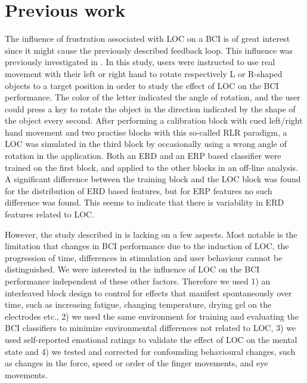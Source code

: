 \section{Previous work}
The influence of frustration associated with \ac{LOC} on a
\ac{BCI} is of great interest since it might cause the previously described
feedback loop. This influence  was previously investigated in
\cite{jatzev2008ecn, zander2009usi}. In this study, users were instructed to
use real movement with their left or right hand to rotate respectively L or
R-shaped objects to a target position in order to study the effect of \acl{LOC}
on the \ac{BCI} performance.
%
The color of the letter indicated the angle of rotation, and the user could
press a key to rotate the object in the direction indicated by the shape of the
object every second.
%
After performing a calibration block with cued left/right hand movement and two
practise blocks with this so-called RLR paradigm, a \ac{LOC} was simulated in
the third block by occasionally using a wrong angle of rotation in the
application. Both an \ac{ERD} and an \ac{ERP} based classifier were trained on
the first block, and applied to the other blocks in an off-line analysis.  A
significant difference between the training block and the \ac{LOC} block was
found for the distribution of \ac{ERD} based features, but for \ac{ERP}
features no such difference was found. This seems to indicate that there is
variability in \ac{ERD} features related to \acl{LOC}. 

However, the study described in \cite{jatzev2008ecn, zander2009usi} is lacking
on a few aspects. Most notable is the limitation that changes in \ac{BCI}
performance due to the induction of \ac{LOC}, the progression of time,
differences in stimulation and user behaviour cannot be distinguished.
%
We were interested in the influence of \ac{LOC} on the \ac{BCI} performance
independent of these other factors. Therefore we used 1) an interleaved block
design to control for effects that manifest spontaneously over time, such as
increasing fatigue, changing temperature, drying gel on the electrodes etc., 2)
we used the same environment for training and evaluating the \ac{BCI}
classifiers to minimize environmental differences not related to \ac{LOC}, 3)
we used self-reported emotional ratings to validate the effect of \acl{LOC} on
the mental state and 4) we tested and corrected for confounding behavioural
changes, such as changes in the force, speed or order of the finger movements,
and eye movements. 
